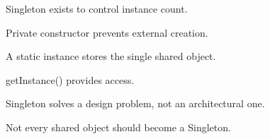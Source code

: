 \documentclass[11pt,a4paper]{book}
\begin{document}
\begin{rosettarule}

Singleton exists to control
instance count.

\end{rosettarule}


\begin{rosettarule}

Private constructor prevents
external creation.

\end{rosettarule}


\begin{rosettarule}

A static instance stores the
single shared object.

\end{rosettarule}


\begin{rosettarule}

getInstance() provides access.

\end{rosettarule}


\begin{rosettarule}

Singleton solves a design
problem, not an architectural one.

\end{rosettarule}


\begin{rosettarule}

Not every shared object should
become a Singleton.

\end{rosettarule}

\end{document}
